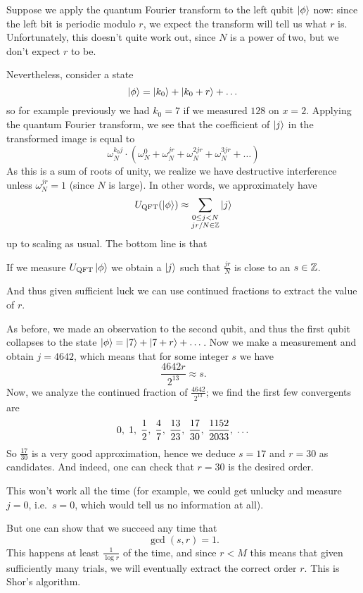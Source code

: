 Suppose we apply the quantum Fourier transform to the left qubit $\ket\phi$ now:
since the left bit is periodic modulo $r$, we expect the transform
will tell us what $r$ is.
Unfortunately, this doesn't quite work out, since $N$ is a power of two,
but we don't expect $r$ to be.

Nevertheless, consider a state
\[ \ket\phi = \ket{k_0} + \ket{k_0+r} + \dots \]
so for example previously we had $k_0=7$ if we measured $128$ on $x=2$.
Applying the quantum Fourier transform, we see that the
coefficient of $\ket j$ in the transformed image is equal to
\[
	\omega_N^{k_0j} \cdot
	\left( \omega_N^{0} + \omega_N^{jr} + \omega_N^{2jr}
	+ \omega_N^{3jr} + \dots \right)
\]
As this is a sum of roots of unity, we realize we have
destructive interference unless $\omega_N^{jr} = 1$ (since $N$ is large).
In other words, we approximately have
\[
	U_{\mathrm{QFT}}(\ket\phi)
	\approx
	\sum_{\substack{0 \le j < N \\ jr/N \in \mathbb Z}} \ket j
\]
up to scaling as usual.
The bottom line is that
\begin{moral}
	If we measure $U_{\mathrm{QFT}}\ket\phi$ we obtain a $\ket j$ such that
	$\frac{jr}{N}$ is close to an $s \in \mathbb Z$.
\end{moral}
And thus given sufficient luck we can use continued fractions
to extract the value of $r$.

\begin{example}
	[Finishing the factoring of $M = 77$]
	As before, we made an observation to the second qubit,
	and thus the first qubit collapses to the state
	$\ket\phi = \ket7 + \ket{7+r} + \dots$.
	Now we make a measurement and obtain $j = 4642$, which means that
	for some integer $s$ we have
	\[ \frac{4642r}{2^{13}} \approx s. \]
	Now, we analyze the continued fraction of $\frac{4642}{2^{13}}$;
	we find the first few convergents are
	\[
		0, \;
		1, \;
		\frac{1}{2}, \;
		\frac{4}{7}, \;
		\frac{13}{23}, \;
		\frac{17}{30}, \;
		\frac{1152}{2033}, \;
		\dots
	\]
	So $\frac{17}{30}$ is a very good approximation,
	hence we deduce $s = 17$ and $r = 30$ as candidates.
	And indeed, one can check that $r = 30$ is the desired order.
\end{example}

This won't work all the time (for example, we could get unlucky and
measure $j=0$, i.e.\ $s=0$, which would tell us no information at all).

But one can show that we succeed any time that \[ \gcd(s,r) = 1. \]
This happens at least $\frac{1}{\log r}$ of the time,
and since $r < M$ this means that given sufficiently many trials,
we will eventually extract the correct order $r$.
This is Shor's algorithm.
